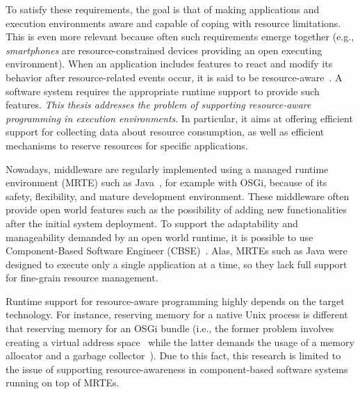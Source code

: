 To satisfy these requirements, the goal is that of making applications and execution environments aware and capable of coping with resource limitations.
This is even more relevant because often such requirements emerge together
(e.g., \textit{smartphones} are resource-constrained devices providing an open executing environment).
When an application includes features to react and modify its behavior after resource-related events occur, it is said to be resource-aware~\cite{Boldrini:2008:CRA:1549824.1550106,Peddemors:2007:NRA:1256316.1256338,Alhaisoni:2010:RTO:1664767.1664770,Polo:2011:RAS:2414338.2414352,Bulej:2012:PAC:2408860.2410068,autili2012hybrid}.
A software system requires the appropriate runtime support to provide such features.   
\textit{This thesis addresses the problem of supporting resource-aware programming in execution environments}.
In particular, it aims at offering efficient support for collecting data about resource consumption, as well as efficient mechanisms to reserve resources for specific applications.

Nowadays, middleware are regularly implemented using a managed runtime environment (MRTE) such as Java~\cite{Bruneton:2006:FCM:1152333.1152345,Fouquet:2014:DED:2602576.2611461,OracleEJB3.0,Becker:2010:PCM:1712605.1712651,Carlson2006127}, for example with OSGi, because of its safety, flexibility, and mature  development environment.
These middleware often provide open world features such as the possibility of adding new functionalities after the initial system deployment.
To support the adaptability and manageability demanded by an open world runtime, it is possible to use  Component-Based Software Engineer (CBSE)~\cite{gruntz2002component,Duclos:2002:DUN:508386.508394, Bruneton:2006:FCM:1152333.1152345}.
Alas, MRTEs such as Java were designed to execute only a single application at a time, so they lack full support for fine-grain resource management.

Runtime support for resource-aware programming highly depends on the target technology.
For instance, reserving memory for a native Unix process is different that reserving memory for an OSGi bundle (i.e., the former problem involves creating a virtual address space~\cite{Stallings2014} while the latter demands the usage of a memory allocator and a garbage collector~\cite{OSGiAlliance2014,alpern2000jalapeno,Richard2012,Geoffray:2010:VSM:1837854.1736006}).
Due to this fact, this research is limited to the issue of supporting resource-awareness in component-based software systems running on top of MRTEs.


